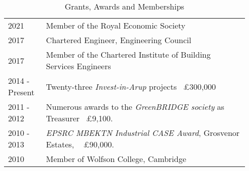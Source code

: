 \documentclass[11pt, oneside]{article}   	%
\begin{document}
\begin{table}[h]
\caption*{Grants, Awards and Memberships}
\vspace{-5mm}
\small
\begin{center}
\begin{tabular}{p{0.15\linewidth} p{0.8\linewidth}}
\hline
2021&Member of the Royal Economic Society\\
2017&Chartered Engineer, Engineering Council \\
2017 &Member of the Chartered Institute of Building Services Engineers\\
2014 - Present&Twenty-three \emph{Invest-in-Arup} projects ~£300,000 \\
2011 - 2012&Numerous awards to the \emph{GreenBRIDGE society} as Treasurer ~£9,100. \\
2010 - 2013&\emph{EPSRC MBEKTN Industrial CASE Award}, Grosvenor Estates, ~ £90,000. \\
2010&Member of Wolfson College, Cambridge\\
\hline
\end{tabular}
\end{center}
\vspace{-10mm}
\end{table}

\pagebreak
\end{document}
